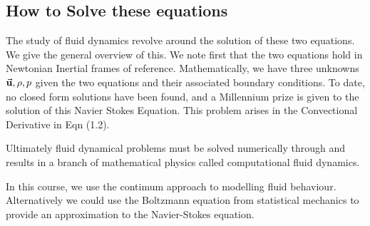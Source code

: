 \subsection{How to Solve these equations}
The study of fluid dynamics revolve around the solution of these two equations. We give the general overview of this. We note first that the two equations hold in Newtonian Inertial frames of reference. Mathematically, we have three unknowns $\vec{\mathbf{u}}, \rho, p$ given the two equations and their associated boundary conditions. To date, no closed form solutions have been found, and a Millennium prize is given to the solution of this Navier Stokes Equation. 
This problem arises in the Convectional Derivative in Eqn (1.2).\par
Ultimately fluid dynamical problems must be solved numerically through and results in a branch of mathematical physics called computational fluid dynamics. \par In this course, we use the contimum approach to modelling fluid behaviour. Alternatively we could use the Boltzmann equation from statistical mechanics to provide an approximation to the Navier-Stokes equation.